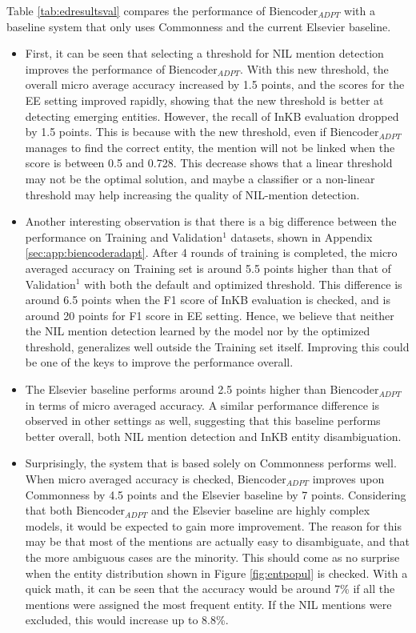 \documentclass{report}
\theoremstyle{definition}
\theoremstyle{remark}
\begin{document}
Table \ref{tab:edresultsval} compares the performance of Biencoder$_{ADPT}$ with a baseline system that only uses Commonness and the current Elsevier baseline.
\begin{itemize}
    \item First, it can be seen that selecting a threshold for NIL mention detection improves the performance of Biencoder$_{ADPT}$. With this new threshold, the overall micro average accuracy increased by 1.5 points, and the scores for the EE setting improved rapidly, showing that the new threshold is better at detecting emerging entities. However, the recall of InKB evaluation dropped by 1.5 points. This is because with the new threshold, even if Biencoder$_{ADPT}$ manages to find the correct entity, the mention will not be linked when the score is between 0.5 and 0.728. This decrease shows that a linear threshold may not be the optimal solution, and maybe a classifier or a non-linear threshold may help increasing the quality of NIL-mention detection.
    \item Another interesting observation is that there is a big difference between the performance on Training and Validation$^1$ datasets, shown in Appendix \ref{sec:app:biencoderadapt}. After 4 rounds of training is completed, the micro averaged accuracy on Training set is around 5.5 points higher than that of Validation$^1$ with both the default and optimized threshold. This difference is around 6.5 points when the F1 score of InKB evaluation is checked, and is around 20 points for F1 score in EE setting. Hence, we believe that neither the NIL mention detection learned by the model nor by the optimized threshold, generalizes well outside the Training set itself. Improving this could be one of the keys to improve the performance overall.
    \item The Elsevier baseline performs around 2.5 points higher than Biencoder$_{ADPT}$ in terms of micro averaged accuracy. A similar performance difference is observed in other settings as well, suggesting that this baseline performs better overall, both NIL mention detection and InKB entity disambiguation.
    \item Surprisingly, the system that is based solely on Commonness performs well. When micro averaged accuracy is checked, Biencoder$_{ADPT}$ improves upon Commonness by 4.5 points and the Elsevier baseline by 7 points. Considering that both Biencoder$_{ADPT}$ and the Elsevier baseline are highly complex models, it would be expected to gain more improvement. The reason for this may be that most of the mentions are actually easy to disambiguate, and that the more ambiguous cases are the minority. This should come as no surprise when the entity distribution shown in Figure \ref{fig:entpopul} is checked. With a quick math, it can be seen that the accuracy would be around 7\% if all the mentions were assigned the most frequent entity. If the NIL mentions were excluded, this would increase up to 8.8\%.

\end{itemize}
\end{document}

